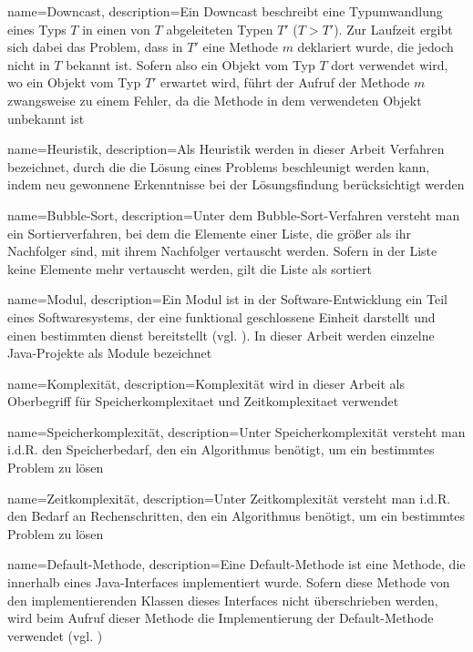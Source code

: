 {
    name=Downcast,
    description={Ein Downcast beschreibt eine Typumwandlung eines Typs $T$ in einen von $T$ abgeleiteten Typen $T'$ ($T > T'$). Zur Laufzeit ergibt sich dabei das Problem, dass in $T'$ eine Methode $m$ deklariert wurde, die jedoch nicht in $T$ bekannt ist. Sofern also ein Objekt vom Typ $T$ dort verwendet wird, wo ein Objekt vom Typ $T'$ erwartet wird, führt der Aufruf der Methode $m$ zwangsweise zu einem Fehler, da die Methode in dem verwendeten Objekt unbekannt ist
}}

{
    name=Heuristik,
    description={Als Heuristik werden in dieser Arbeit Verfahren bezeichnet, durch die die Lösung eines Problems beschleunigt werden kann, indem neu gewonnene Erkenntnisse bei der Lösungsfindung berücksichtigt werden}
   }

{
    name=Bubble-Sort,
    description={Unter dem Bubble-Sort-Verfahren versteht man ein Sortierverfahren, bei dem die Elemente einer Liste, die größer als ihr Nachfolger sind, mit ihrem Nachfolger vertauscht werden. Sofern in der Liste keine Elemente mehr vertauscht werden, gilt die Liste als sortiert
    }
}

{
    name=Modul,
    description={Ein Modul ist in der Software-Entwicklung ein Teil eines Softwaresystems, der eine funktional geschlossene Einheit darstellt und einen bestimmten dienst bereitstellt (vgl. \cite{modul}). In dieser Arbeit werden einzelne Java-Projekte als Module bezeichnet}
}

{
    name=Komplexität,
    description={Komplexität wird in dieser Arbeit als Oberbegriff für \Gls{Speicherkomplexitaet} und \Gls{Zeitkomplexitaet} verwendet
    }
}


{
    name=Speicherkomplexität,
    description={Unter Speicherkomplexität versteht man i.d.R. den Speicherbedarf, den ein Algorithmus benötigt, um ein bestimmtes Problem zu lösen}
}


{
    name=Zeitkomplexität,
    description={Unter Zeitkomplexität versteht man i.d.R. den Bedarf an Rechenschritten, den ein Algorithmus benötigt, um ein bestimmtes Problem zu lösen}
}

{
    name=Default-Methode,
    description={Eine Default-Methode ist eine Methode, die innerhalb eines Java-\Gls{Interface}s implementiert wurde. Sofern diese Methode von den implementierenden Klassen dieses \Gls{Interface}s nicht überschrieben werden, wird beim Aufruf dieser Methode die Implementierung der Default-Methode verwendet (vgl. \cite{dmethod})
    }
}
